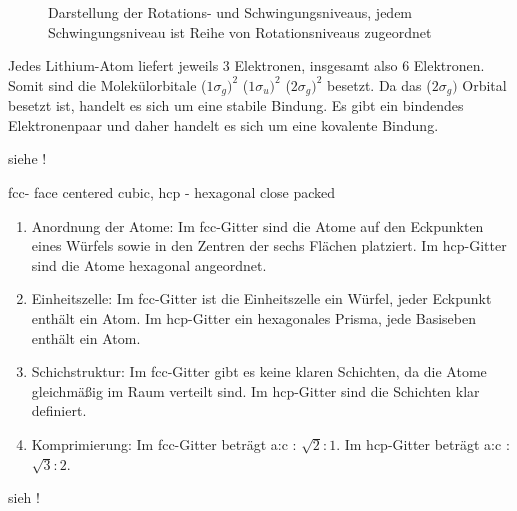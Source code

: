 \begin{figure}[H]
\begin{minipage}[b]{.4\linewidth}
      \caption{Darstellung der Rotations- und Schwingungsniveaus, jedem Schwingungsniveau ist Reihe von Rotationsniveaus zugeordnet}
   \end{minipage}
    \end{figure}
\label{q:44}
Jedes Lithium-Atom liefert jeweils 3 Elektronen, insgesamt also 6 Elektronen. 
Somit sind die Molekülorbitale ($1\sigma_g)^2$ ($1\sigma_u)^2$ ($2\sigma_g)^2$ besetzt. 
Da das ($2\sigma_g)$ Orbital besetzt ist, handelt es sich um eine stabile Bindung. 
Es gibt ein bindendes Elektronenpaar und daher handelt es sich um eine kovalente Bindung.

\label{q:45}

siehe !

\label{q:46}

fcc- face centered cubic, hcp - hexagonal close packed

\begin{enumerate}
    \item Anordnung der Atome: Im fcc-Gitter sind die Atome auf den Eckpunkten eines Würfels sowie in den Zentren der sechs Flächen platziert. Im hcp-Gitter sind die Atome hexagonal angeordnet.
    \item Einheitszelle: Im fcc-Gitter ist die Einheitszelle ein Würfel, jeder Eckpunkt enthält ein Atom. Im hcp-Gitter ein hexagonales Prisma, jede Basiseben enthält ein Atom.
    \item Schichstruktur: Im fcc-Gitter gibt es keine klaren Schichten, da die Atome gleichmäßig im Raum verteilt sind. Im hcp-Gitter sind die Schichten klar definiert.
    \item Komprimierung: Im fcc-Gitter beträgt a:c : $\sqrt{2}:1$. Im hcp-Gitter beträgt a:c : $\sqrt{3}:2$.
\end{enumerate}

\label{q:47}
sieh !

\label{q:48}


